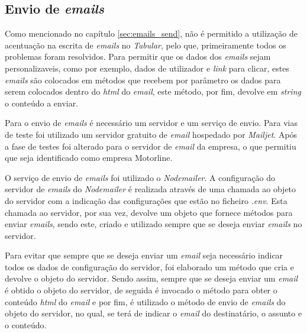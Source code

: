 \subsection{Envio de \textit{emails}}
Como mencionado no capítulo \ref{sec:emails_send}, não é permitido a utilização de acentuação na escrita de \textit{emails} no \textit{Tabular}, pelo que, primeiramente todos os problemas foram resolvidos. Para permitir que os dados dos \textit{emails} sejam personalizaveis, como por exemplo, dados de utilizador e \textit{link} para clicar, estes \textit{emails} são colocados em métodos que recebem por parâmetro os dados para serem colocados dentro do \textit{html} do \textit{email}, este método, por fim, devolve em \textit{string} o conteúdo a enviar.

Para o envio de \textit{emails} é necessário um servidor e um serviço de envio. Para vias de teste foi utilizado um servidor gratuito de \textit{email} hospedado por \textit{Mailjet}. Após a fase de testes foi alterado para o servidor de \textit{email} da empresa, o que permitiu que seja identificado como empresa Motorline.

O serviço de envio de \textit{emails} foi utilizado o \textit{Nodemailer}. A configuração do servidor de \textit{emails} do \textit{Nodemailer} é realizada através de uma chamada ao objeto do servidor com a indicação das configurações que estão no ficheiro \textit{.env}. Esta chamada ao servidor, por sua vez, devolve um objeto que fornece métodos para enviar \textit{emails}, sendo este, criado e utilizado sempre que se deseja enviar \textit{emails} no servidor.

Para evitar que sempre que se deseja enviar um \textit{email} seja necessário indicar todos os dados de configuração do servidor, foi elaborado um método que cria e devolve o objeto do servidor. Sendo assim, sempre que se deseja enviar um \textit{email} é obtido o objeto do servidor, de seguida é invocado o método para obter o conteúdo \textit{html} do \textit{email} e por fim, é utilizado o método de envio de \textit{emails} do objeto do servidor, no qual, se terá de indicar o \textit{email} do destinatário, o assunto e o conteúdo.
